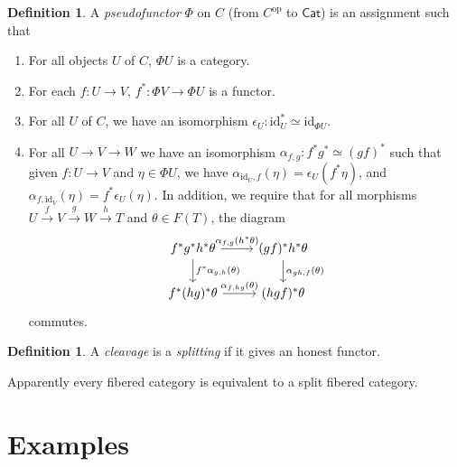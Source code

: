 \documentclass[leqno, openany]{memoir}
\theoremstyle{definition}
\newtheorem{defn}[thm]{Definition}
\theoremstyle{remark}
\theoremstyle{plain}
\theoremstyle{definition}
\theoremstyle{remark}
\newcommand{\mr}[1]{\mathrm{#1}}
\newcommand{\ms}[1]{\mathsf{#1}}
\begin{document}
\begin{defn}
    A \textit{pseudofunctor} $\Phi$ on $C$ (from $C^{\mr{op}}$ to $\ms{Cat}$) is an assignment such that
    \begin{enumerate}
        \item For all objects $U$ of $C$, $\Phi U$ is a category.
        \item For each $f \colon U \to V$, $f^* \colon \Phi V \to \Phi U$ is a functor.
        \item For all $U$ of $C$, we have an isomorphism $\epsilon_U \colon \mr{id}^*_U \simeq \mr{id}_{\Phi U}$.
        \item For all $U \to V \to W$ we have an isomorphism $\alpha_{f,g} \colon f^* g^* \simeq (gf)^*$ such that given $f \colon U \to V$ and $\eta \in \Phi U$, we have $\alpha_{\mr{id}_U, f}(\eta) = \epsilon_U(f^* \eta)$, and $\alpha_{f, \mr{id}_V}(\eta) = f^* \epsilon_U(\eta)$. In addition, we require that for all morphisms $U \xrightarrow{f} V \xrightarrow{g} W \xrightarrow{h} T$ and $\theta \in F(T)$, the diagram
            \begin{equation*}
            \begin{tikzcd}
                f^* g^* h^* \theta \arrow{r}{\alpha_{f,g}(h^* \theta)} \arrow{d}{f^* \alpha_{g,h}(\theta)} & (gf)^* h^* \theta \arrow{d}{\alpha_{gh,f}(\theta)} \\
                f^*(hg)^* \theta \arrow{r}{\alpha_{f,hg}(\theta)} & (hgf)^* \theta
            \end{tikzcd}
            \end{equation*}
            commutes.
    \end{enumerate}
\end{defn}

\begin{defn}
    A \textit{cleavage} is a \textit{splitting} if it gives an honest functor.  
\end{defn}

Apparently every fibered category is equivalent to a split fibered category.

\section{Examples}%
\label{sec:examples}
\end{document}

